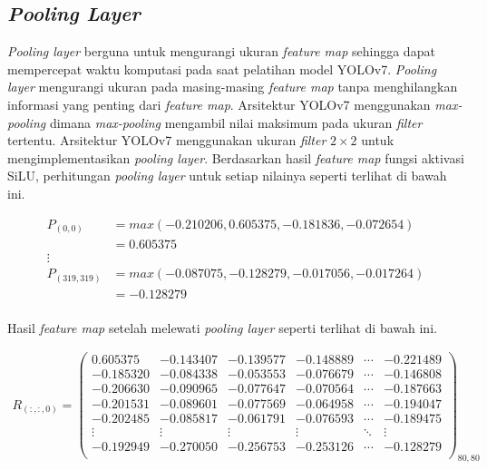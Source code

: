     \subsection{\textit{Pooling Layer}}

    \textit{Pooling layer} berguna untuk mengurangi ukuran \textit{feature map} sehingga dapat mempercepat waktu komputasi pada saat pelatihan model YOLOv7. \textit{Pooling layer} mengurangi ukuran pada masing-masing \textit{feature map} tanpa menghilangkan informasi yang penting dari \textit{feature map}. Arsitektur YOLOv7 menggunakan \textit{max-pooling} dimana \textit{max-pooling} mengambil nilai maksimum pada ukuran \textit{filter} tertentu. Arsitektur YOLOv7 menggunakan ukuran \textit{filter} $2\times 2$ untuk mengimplementasikan \textit{pooling layer}. Berdasarkan hasil \textit{feature map} fungsi aktivasi SiLU, perhitungan \textit{pooling layer} untuk setiap nilainya seperti terlihat di bawah ini.

    \begin{align*}
        P_{(0, 0)}      &= max(-0.210206, 0.605375, -0.181836, -0.072654)\\
                        &= 0.605375 \\
        \vdots \\
        P_{(319, 319)}  &= max(-0.087075, -0.128279, -0.017056, -0.017264)\\
                        &= -0.128279 \\
    \end{align*}

    Hasil \textit{feature map} setelah melewati \textit{pooling layer} seperti terlihat di bawah ini.

    \begin{align*}
        R_{(:, :, 0)} = 
        \begin{pmatrix}
            0.605375  & -0.143407 & -0.139577 & -0.148889 & \cdots & -0.221489 \\
            -0.185320 & -0.084338 & -0.053553 & -0.076679 & \cdots & -0.146808 \\
            -0.206630 & -0.090965 & -0.077647 & -0.070564 & \cdots & -0.187663 \\
            -0.201531 & -0.089601 & -0.077569 & -0.064958 & \cdots & -0.194047 \\
            -0.202485 & -0.085817 & -0.061791 & -0.076593 & \cdots & -0.189475 \\
            \vdots    & \vdots    & \vdots    & \vdots    & \ddots & \vdots \\
            -0.192949 & -0.270050 & -0.256753 & -0.253126 & \cdots & -0.128279 \\
        \end{pmatrix}_{80, 80}
    \end{align*}

